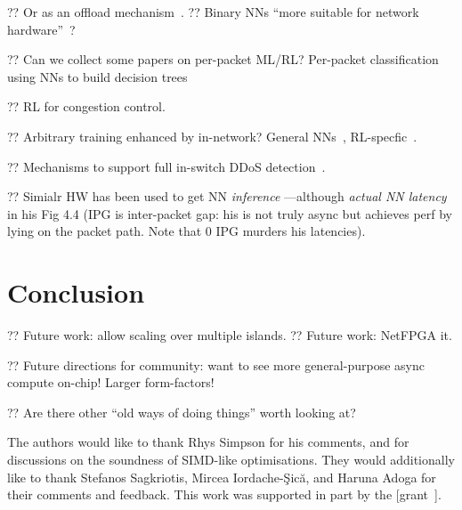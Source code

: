 \documentclass[sigconf,natbib=false]{acmart}
\begin{document}
?? Or as an offload mechanism~\parencite{DBLP:conf/sigcomm/SanvitoSB18,DBLP:journals/corr/abs-1801-05731}.
?? Binary NNs ``more suitable for network hardware''~\parencite{DBLP:journals/corr/MiyashitaLM16}?

?? Can we collect some papers on per-packet ML/RL? Per-packet classification using NNs to build decision trees~\parencite{DBLP:conf/sigcomm/LiangZJS19}

?? RL for congestion control. ~\parencite{DBLP:journals/corr/abs-1910-04054}

?? Arbitrary training enhanced by in-network? General NNs~\parencite{DBLP:conf/micro/LiPAYQPWSEK18}, RL-specfic~\parencite{DBLP:conf/isca/LiLYCSH19}.

?? Mechanisms to support full in-switch DDoS detection~\cite{tnms-ddos-victim-ident}.

?? Simialr HW has been used to get NN \emph{inference} \textcite{langlet-ml-netronome}---although \emph{actual NN latency} in his Fig 4.4 (IPG is inter-packet gap: his is not truly async but achieves perf by lying on the packet path. Note that 0 IPG murders his latencies).

\section{Conclusion}

?? Future work: allow scaling over multiple islands.
?? Future work: NetFPGA it.

?? Future directions for community: want to see more general-purpose async compute on-chip! Larger form-factors!

?? Are there other ``old ways of doing things'' worth looking at?

\begin{acks}
	The authors would like to thank Rhys Simpson for his comments, and for discussions on the soundness of SIMD-like optimisations.
	They would additionally like to thank Stefanos Sagkriotis, Mircea Iordache-\c{S}ic\u{a}, and Haruna Adoga for their comments and feedback.
	This work was supported in part by the  [grant~].
\end{acks}
	
%
%
\printbibliography
\end{document}
